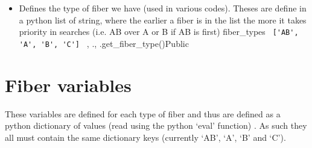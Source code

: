 \begin{itemize}
\item \label{text:fiber_types} 
{Defines the type of fiber we have (used in various codes). Theses are define in a python list of string, where the earlier a fiber is in the list the more it takes priority in searches (i.e. AB over A or B if AB is first)}
{fiber\_types}
{\lstinline[style=pythoninline]| ['AB', 'A', 'B', 'C'] |}
{\calextractRAW, \calDRIFTE}{\constantsfile}{\calextractRAW.\progMAIN, \spirouStartup.get\_fiber\_type()}{Public}


\end{itemize}






\clearpage
\newpage
\section{Fiber variables}
\label{ch:variables:fiber}

These variables are defined for each type of fiber and thus are defined as a python dictionary of values \ifdevguide (read using the python `eval' function) \fi. As such they all must contain the same dictionary keys (currently `AB', `A', `B' and `C'). 


